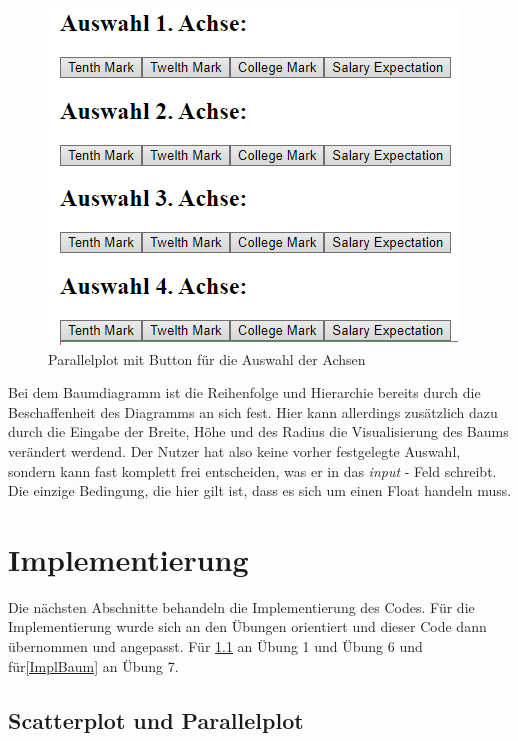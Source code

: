 \documentclass[usegeometry=true]{scrartcl}
\begin{document}
\begin{figure}[h]
\begin{center}
	\includegraphics[scale=.5]{WahlAchse.png}
	\caption{Parallelplot mit Button für die Auswahl der Achsen}
	\label{Buttons}
\end{center}
\end{figure}

Bei dem Baumdiagramm ist die Reihenfolge und Hierarchie bereits durch die Beschaffenheit des Diagramms an sich fest. Hier kann allerdings zusätzlich dazu durch die Eingabe der Breite, Höhe und des Radius die Visualisierung des Baums verändert werdend. Der Nutzer hat also keine vorher festgelegte Auswahl, sondern kann fast komplett frei entscheiden, was er in das \textit{input} - Feld schreibt. Die einzige Bedingung, die hier gilt ist, dass es sich um einen Float handeln muss.



\section{Implementierung}

Die nächsten Abschnitte behandeln die Implementierung des Codes. Für die Implementierung wurde sich an den Übungen orientiert und dieser Code dann übernommen und angepasst. Für \ref{ScatterParallel} an Übung 1 und  Übung 6 und für\ref{ImplBaum} an Übung 7.\\

\subsection{Scatterplot und Parallelplot}
\label{ScatterParallel}
\end{document}
